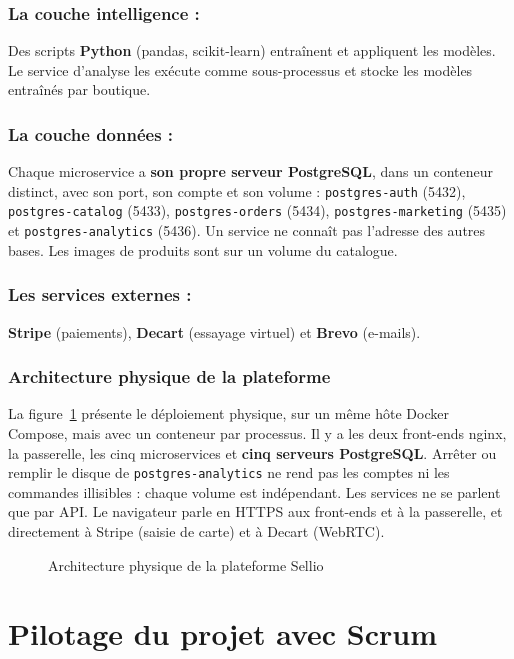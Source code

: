 \subsubsection*{La couche intelligence :}
Des scripts \textbf{Python} (pandas, scikit-learn) entraînent et appliquent les modèles. Le service d'analyse les exécute comme sous-processus et stocke les modèles entraînés par boutique.

\subsubsection*{La couche données :}
Chaque microservice a \textbf{son propre serveur PostgreSQL}, dans un conteneur distinct, avec son port, son compte et son volume : \texttt{postgres-auth} (5432), \texttt{postgres-catalog} (5433), \texttt{postgres-orders} (5434), \texttt{postgres-marketing} (5435) et \texttt{postgres-analytics} (5436). Un service ne connaît pas l'adresse des autres bases. Les images de produits sont sur un volume du catalogue.

\subsubsection*{Les services externes :}
\textbf{Stripe} (paiements), \textbf{Decart} (essayage virtuel) et \textbf{Brevo} (e-mails).

\subsubsection{Architecture physique de la plateforme}
La figure~\ref{fig:archi_physique} présente le déploiement physique, sur un même hôte Docker Compose, mais avec un conteneur par processus. Il y a les deux front-ends nginx, la passerelle, les cinq microservices et \textbf{cinq serveurs PostgreSQL}. Arrêter ou remplir le disque de \texttt{postgres-analytics} ne rend pas les comptes ni les commandes illisibles : chaque volume est indépendant. Les services ne se parlent que par API. Le navigateur parle en HTTPS aux front-ends et à la passerelle, et directement à Stripe (saisie de carte) et à Decart (WebRTC).
\begin{figure}[H]
    \centering
    \caption{Architecture physique de la plateforme Sellio}
    \label{fig:archi_physique}
\end{figure}

\section{Pilotage du projet avec Scrum}
